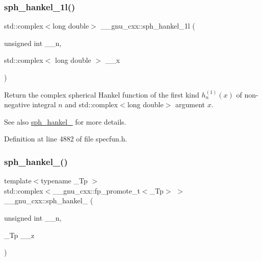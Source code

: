 \subsubsection{\texorpdfstring{sph\+\_\+hankel\+\_\+1l()}{sph\_hankel\_1l()}\hspace{0.1cm}{\footnotesize\ttfamily [2/2]}}
{\footnotesize\ttfamily std\+::complex$<$long double$>$ \+\_\+\+\_\+gnu\+\_\+cxx\+::sph\+\_\+hankel\+\_\+1l (\begin{DoxyParamCaption}\item[{unsigned int}]{\+\_\+\+\_\+n,  }\item[{std\+::complex$<$ long double $>$}]{\+\_\+\+\_\+x }\end{DoxyParamCaption})\hspace{0.3cm}{\ttfamily [inline]}}

Return the complex spherical Hankel function of the first kind $ h^{(1)}_n(x) $ of non-\/negative integral $ n $ and {\ttfamily std\+::complex$<$long double$>$} argument $ x $.

\begin{DoxySeeAlso}{See also}
\hyperlink{group__gnu__math__spec__func_ga4424f565fb224ab88b177beb65d08305}{sph\+\_\+hankel\+\_} for more details. 
\end{DoxySeeAlso}


Definition at line 4882 of file specfun.\+h.

\mbox{\label{group__gnu__math__spec__func_ga1ca08866a25e3637b04c57ff5a0c36a5}} 
\subsubsection{\texorpdfstring{sph\+\_\+hankel\+\_()}{sph\_hankel\_2()}\hspace{0.1cm}{\footnotesize\ttfamily [1/2]}}
{\footnotesize\ttfamily template$<$typename \+\_\+\+Tp $>$ \\
std\+::complex$<$\+\_\+\+\_\+gnu\+\_\+cxx\+::fp\+\_\+promote\+\_\+t$<$\+\_\+\+Tp$>$ $>$ \+\_\+\+\_\+gnu\+\_\+cxx\+::sph\+\_\+hankel\+\_ (\begin{DoxyParamCaption}\item[{unsigned int}]{\+\_\+\+\_\+n,  }\item[{\+\_\+\+Tp}]{\+\_\+\+\_\+z }\end{DoxyParamCaption})\hspace{0.3cm}{\ttfamily [inline]}}

